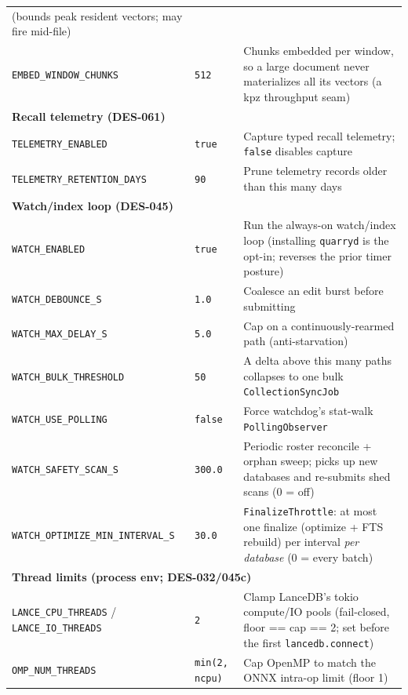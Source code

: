 \documentclass[a4paper,10pt]{article}
\begin{document}
\begin{center}
\begin{longtable}{llp{6.5cm}}
  (bounds peak resident vectors; may fire mid-file) \\
\texttt{EMBED\_WINDOW\_CHUNKS} & \texttt{512} &
  Chunks embedded per window, so a large document never materializes
  all its vectors (a kpz throughput seam) \\
\midrule
\multicolumn{3}{l}{\textbf{Recall telemetry (DES-061)}} \\
\midrule
\texttt{TELEMETRY\_ENABLED}         & \texttt{true} &
  Capture typed recall telemetry; \texttt{false} disables capture \\
\texttt{TELEMETRY\_RETENTION\_DAYS} & \texttt{90} &
  Prune telemetry records older than this many days \\
\midrule
\multicolumn{3}{l}{\textbf{Watch/index loop (DES-045)}} \\
\midrule
\texttt{WATCH\_ENABLED}        & \texttt{true} &
  Run the always-on watch/index loop (installing \texttt{quarryd} is the
  opt-in; reverses the prior timer posture) \\
\texttt{WATCH\_DEBOUNCE\_S}    & \texttt{1.0} &
  Coalesce an edit burst before submitting \\
\texttt{WATCH\_MAX\_DELAY\_S}  & \texttt{5.0} &
  Cap on a continuously-rearmed path (anti-starvation) \\
\texttt{WATCH\_BULK\_THRESHOLD} & \texttt{50} &
  A delta above this many paths collapses to one bulk
  \texttt{CollectionSyncJob} \\
\texttt{WATCH\_USE\_POLLING}   & \texttt{false} &
  Force watchdog's stat-walk \texttt{PollingObserver} \\
\texttt{WATCH\_SAFETY\_SCAN\_S} & \texttt{300.0} &
  Periodic roster reconcile + orphan sweep; picks up new databases and
  re-submits shed scans (0 = off) \\
\texttt{WATCH\_OPTIMIZE\_MIN\_INTERVAL\_S} & \texttt{30.0} &
  \texttt{FinalizeThrottle}: at most one finalize (optimize + FTS
  rebuild) per interval \emph{per database} (0 = every batch) \\
\midrule
\multicolumn{3}{l}{\textbf{Thread limits (process env; DES-032/045c)}} \\
\midrule
\texttt{LANCE\_CPU\_THREADS} / \texttt{LANCE\_IO\_THREADS} & \texttt{2} &
  Clamp LanceDB's tokio compute/IO pools (fail-closed, floor == cap == 2;
  set before the first \texttt{lancedb.connect}) \\
\texttt{OMP\_NUM\_THREADS}     & \texttt{min(2, ncpu)} &
  Cap OpenMP to match the ONNX intra-op limit (floor 1) \\
\bottomrule
\end{longtable}
\end{center}
\end{document}
